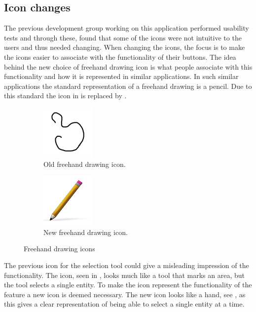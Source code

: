 \subsection{Icon changes}
The previous development group working on this application \citep{misc:crocold} performed usability tests and through these, found that some of the icons were not intuitive to the users and thus needed changing.
When changing the icons, the focus is to make the icons easier to associate with the functionality of their buttons.
The idea behind the new choice of freehand drawing icon is what people associate with this functionality and how it is represented in similar applications.
In such similar applications the standard representation of a freehand drawing is a pencil.
Due to this standard the icon in  is replaced by .

\begin{figure}[h]
	\centering
	\begin{subfigure}[b]{0.45\textwidth}
		\centering
		\includegraphics[scale = 0.1]{media/freehandOld}
		\caption{Old freehand drawing icon.}
		\label{figure:old-freehand}
	\end{subfigure}
	\qquad
	\begin{subfigure}[b]{0.45\textwidth}
		\centering
		\includegraphics[scale = 1]{media/freehandNew}
		\caption{New freehand drawing icon.}
		\label{figure:new-freehand}
	\end{subfigure}
	\caption{Freehand drawing icons}
	\label{figure:freehand}
\end{figure}

The previous icon for the selection tool could give a misleading impression of the functionality.
The icon, seen in , looks much like a tool that marks an area, but the tool selects a single entity.
To make the icon represent the functionality of the feature a new icon is deemed necessary.
The new icon looks like a hand, see , as this gives a clear representation of being able to select a single entity at a time.

